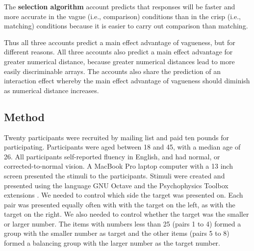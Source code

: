 The {\bf selection algorithm} account predicts that responses will be faster and more accurate in the vague (i.e., comparison) conditions than in the crisp (i.e., matching) conditions because it is easier to carry out comparison than matching. 

Thus all three accounts predict a main effect advantage of vagueness, but for different reasons. All three accounts also predict a main effect advantage for greater numerical distance, because greater numerical distances lead to more easily discriminable arrays. The accounts also share the prediction of an interaction effect whereby the main effect advantage of vagueness should diminish as numerical distance increases.



\subsection{Method}
Twenty participants were recruited by mailing list and paid ten pounds for participating. Participants were aged between 18 and 45, with a median age of 26. All participants self-reported fluency in English, and had normal, or corrected-to-normal vision. A MacBook Pro laptop computer with a 13 inch screen presented the stimuli to the participants. Stimuli were created and presented using the language GNU Octave \cite{eaton:2002} and the Psychophysics Toolbox extensions \cite{ptbx1, ptbx2}. We needed to control which side the target was presented on. Each pair was presented equally often with with the target on the left, as with the target on the right. We also needed to control whether the target was the smaller or larger number. The items with numbers less than 25 (pairs 1 to 4) formed a group with the smaller number as target and the other items (pairs 5 to 8) formed a balancing group with the larger number as the target number.

